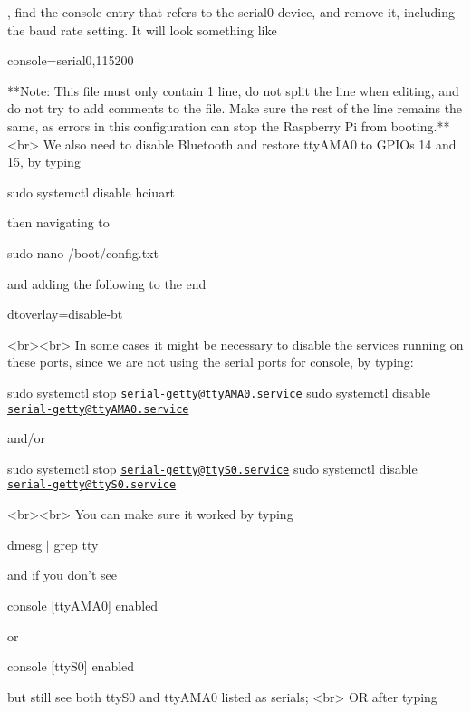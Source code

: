 \begin{DoxyCode}
, find the console entry that refers to the serial0 device, and remove it, including the baud rate setting.
       It will look something like
\end{DoxyCode}
 console=serial0,115200 
\begin{DoxyCode}
**Note: This file must only contain 1 line, do not split the line when editing, and do not try to add
       comments to the file. Make sure the rest of the line remains the same, as errors in this configuration can stop
       the Raspberry Pi from booting.**
<br>
We also need to disable Bluetooth and restore ttyAMA0 to GPIOs 14 and 15, by typing
\end{DoxyCode}
 sudo systemctl disable hciuart 
\begin{DoxyCode}
then navigating to
\end{DoxyCode}
 sudo nano /boot/config.txt 
\begin{DoxyCode}
and adding the following to the end
\end{DoxyCode}
 dtoverlay=disable-\/bt 
\begin{DoxyCode}
<br><br>
In some cases it might be necessary to disable the services running on these ports, since we are not using
       the serial ports for console, by typing:
\end{DoxyCode}
 sudo systemctl stop \href{mailto:serial-getty@ttyAMA0.service}{\tt serial-\/getty@tty\+A\+M\+A0.\+service} sudo systemctl disable \href{mailto:serial-getty@ttyAMA0.service}{\tt serial-\/getty@tty\+A\+M\+A0.\+service} 
\begin{DoxyCode}
and/or
\end{DoxyCode}
 sudo systemctl stop \href{mailto:serial-getty@ttyS0.service}{\tt serial-\/getty@tty\+S0.\+service} sudo systemctl disable \href{mailto:serial-getty@ttyS0.service}{\tt serial-\/getty@tty\+S0.\+service} 
\begin{DoxyCode}
<br><br>
You can make sure it worked by typing
\end{DoxyCode}
 dmesg $\vert$ grep tty 
\begin{DoxyCode}
and if you don't see 
\end{DoxyCode}
 console \mbox{[}tty\+A\+M\+A0\mbox{]} enabled 
\begin{DoxyCode}
or
\end{DoxyCode}
 console \mbox{[}tty\+S0\mbox{]} enabled 
\begin{DoxyCode}
but still see both ttyS0 and ttyAMA0 listed as serials;
<br>
OR after typing
\end{DoxyCode}
